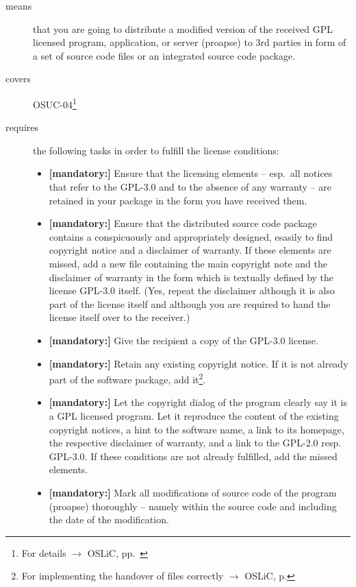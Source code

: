 \begin{description}
\item[means] that you are going to distribute a modified version of the received
GPL licensed program, application, or server (proapse) to 3rd parties in form
of a set of source code files or an integrated source code package.
\item[covers] OSUC-04\footnote{For details $\rightarrow$ OSLiC, pp.\ \pageref{OSUC-04-DEF}}

\item[requires] the following tasks in order to fulfill the license conditions:
\begin{itemize}
  
  \item \textbf{[mandatory:]} Ensure that the licensing elements -- esp.\ all
  notices that refer to the GPL-3.0 and to the absence of any
  warranty -- are retained in your package in the form you have received them.

  \item \textbf{[mandatory:]} Ensure that the distributed source code package
  contains a conspicuously and appropriately designed, esasily to find copyright
  notice and a disclaimer of warranty. If these elements are missed, add a new
  file containing the main copyright note and the disclaimer of warranty in the
  form which is textually defined by the license GPL-3.0 itself. (Yes, repeat
  the disclaimer although it is also part of the license itself and although you
  are required to hand the license itself over to the receiver.)
  
  \item \textbf{[mandatory:]} Give the recipient a copy of the GPL-3.0 license.  \item \textbf{[mandatory:]} Retain any existing copyright notice.
  If it is not already part of the software package, add it\footnote{For
  implementing the handover of files correctly $\rightarrow$ OSLiC, p.
  \pageref{DistributingFilesHint}}.
  
  \item \textbf{[mandatory:]} Let the copyright dialog of the program clearly
  say it is a GPL licensed program. Let it reproduce the content of the existing
  copyright notices, a hint to the software name, a link to its homepage, the
  respective disclaimer of warranty, and a link to the GPL-2.0 resp. GPL-3.0. If
  these conditions are not already fulfilled, add the missed elements.

  \item \textbf{[mandatory:]} Mark all modifications of source code of the
  program (proapse) thoroughly -- namely within the source code and including
  the date of the modification.
  

\end{itemize}
\end{description}
